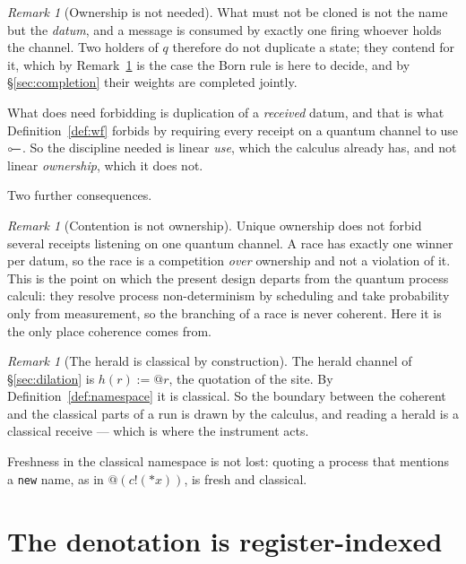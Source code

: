 \documentclass[11pt,a4paper]{article}
\theoremstyle{plain}
\theoremstyle{definition}
\theoremstyle{remark}
\newtheorem{remark}[theorem]{Remark}
\newcommand{\lolli}{\mathrel{\reflectbox{$\multimap$}}}
\begin{document}
\begin{remark}[Ownership is not needed]\label{rem:noownership}
What must not be cloned is not the name but the \emph{datum}, and a message is
consumed by exactly one firing whoever holds the channel. Two holders of $q$
therefore do not duplicate a state; they contend for it, which by
Remark~\ref{rem:contention-ownership} is the case the Born rule is here to
decide, and by \S\ref{sec:completion} their weights are completed jointly.

What does need forbidding is duplication of a \emph{received} datum, and that is
what Definition~\ref{def:wf} forbids by requiring every receipt on a quantum
channel to use $\lolli$. So the discipline needed is linear \emph{use}, which
the calculus already has, and not linear \emph{ownership}, which it does not.
\end{remark}

Two further consequences.

\begin{remark}[Contention is not ownership]\label{rem:contention-ownership}
Unique ownership does not forbid several receipts listening on one quantum
channel. A race has exactly one winner per datum, so the race is a competition
\emph{over} ownership and not a violation of it. This is the point on which the
present design departs from the quantum process calculi: they resolve process
non-determinism by scheduling and take probability only from measurement, so the
branching of a race is never coherent. Here it is the only place coherence comes
from.
\end{remark}

\begin{remark}[The herald is classical by construction]\label{rem:herald-class}
The herald channel of \S\ref{sec:dilation} is $h(r) := @r$, the quotation of the
site. By Definition~\ref{def:namespace} it is classical. So the boundary between
the coherent and the classical parts of a run is drawn by the calculus, and
reading a herald is a classical receive --- which is where the instrument acts.
\end{remark}

Freshness in the classical namespace is not lost: quoting a process that
mentions a \texttt{new} name, as in $@(c!(*x))$, is fresh and classical.

\section{The denotation is register-indexed}\label{sec:register}
\end{document}
